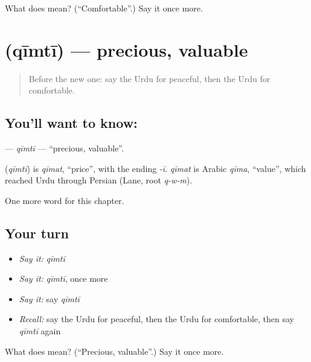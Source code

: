 \begin{tcolorbox}[breakable,colback=teal!4,colframe=teal!35!black,title={Before you move on}]
What does   mean? (\textquotedblleft{}Comfortable\textquotedblright{}.) Say it once more.
\end{tcolorbox}
\section[\texorpdfstring{\ur{قیمتی} (qīmtī)}{قیمتی (qīmtī)}]{ (qīmtī) — precious, valuable}

\label{lesson:UR-C249-qimti}



\begin{quote}
Before the new one: say the Urdu for peaceful, then the Urdu for comfortable.
\end{quote}

\subsection*{You'll want to know: }
\textbf{} — \emph{qīmtī} — \textquotedblleft{}precious, valuable\textquotedblright{}.

\begin{cousinweb}
\textbf{} (\emph{qīmtī}) is \emph{qīmat}, \textquotedblleft{}price\textquotedblright{}, with the ending \emph{-ī}. \emph{qīmat} is Arabic \emph{qīma}, \textquotedblleft{}value\textquotedblright{}, which reached Urdu through Persian (Lane, root \emph{q-w-m}).
\end{cousinweb}

\begin{grammarlens}[title={What you've built}]
One more word for this chapter.
\end{grammarlens}

\subsection*{Your turn}
\begin{itemize}
\raggedright
  \item \emph{Say it:} \emph{qīmtī}
  \item \emph{Say it:} \emph{qīmtī}, once more
  \item \emph{Say it:} say \emph{qīmtī}
  \item \emph{Recall:} say the Urdu for peaceful, then the Urdu for comfortable, then say \emph{qīmtī} again
\end{itemize}

\begin{tcolorbox}[breakable,colback=teal!4,colframe=teal!35!black,title={Before you move on}]
What does  mean? (\textquotedblleft{}Precious, valuable\textquotedblright{}.) Say it once more.
\end{tcolorbox}
